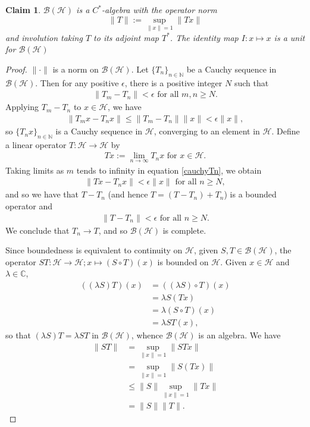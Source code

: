 \documentclass[12pt,a4paper]{amsart}
\theoremstyle{plain}
\newtheorem*{claim}{Claim}
\theoremstyle{definition}
\renewcommand{\H}{\mathcal{H}}
\newcommand{\B}{\mathcal{B}}
\newcommand{\BH}{\mathcal{\B(\H)}}
\newcommand{\1}{\mathbbm{1}}
\newcommand{\C}{\mathbb{C}}
\newcommand{\N}{\mathbb{N}}
\begin{document}
\begin{claim} $\B(\H)$ is a $C^\ast$-algebra with the operator norm 
\[
	\|T\|:= \sup_{\|x\|=1}{\|Tx\|}
\]
and involution taking $T$ to its adjoint map $T^\ast$. 
The identity map $I:x\mapsto x$ is a unit for $\BH$
\end{claim}
\begin{proof}
	$\|\cdot\|$ is a norm on $\BH$. Let $\{T_n\}_{n\in\N}$ be a Cauchy sequence 
	in $\BH$. Then for any positive $\epsilon$, there is a positive integer $N$ such that 
	\begin{align*}
		\|T_m-T_n\| < \epsilon \mbox{ for all } m,n \geq N.
	\end{align*}
	Applying $T_m-T_n$ to $x \in \H$, we have 
	\begin{align}\label{cauchyTn}
		\|T_mx-T_nx\| \leq \|T_m-T_n\| \|x\| < \epsilon \|x\|,
	\end{align}
	so $\{T_nx\}_{n\in\N}$ is a Cauchy sequence in $\H$, converging to an element in $\H$.
	Define a linear operator $T:\H \to \H$ by 
	\begin{align*}
		Tx:= \lim_{n\to\infty}{T_nx} \mbox{ for } x \in \H.
	\end{align*}
	Taking limits as $m$ tends to infinity in equation \eqref{cauchyTn}, we obtain
	\begin{align*}
		\|Tx-T_nx\| < \epsilon \|x\| \mbox{ for all }n \geq N,
	\end{align*}
	and so we have that $T-T_n$ (and hence $T=(T-T_n)+T_n$) is a bounded operator and  
	\begin{align*}
		\|T-T_n\| <\epsilon \mbox{ for all }n \geq N.
	\end{align*}
	We conclude that $T_n \to T$, and so $\BH$ is complete.
	
	Since boundedness is equivalent to continuity on $\H$, given $S,T\in\BH$, the operator 
	$ST:\H \to \H; x \mapsto (S\circ T)(x)$ is bounded on $\H$.
	Given $x\in\H$ and $\lambda\in\C$, 
	\begin{align*}
			((\lambda S)T)(x)
		&=	((\lambda S)\circ T)(x)												\\
		&=	\lambda S(Tx)														\\
		&=	\lambda (S\circ T)(x)												\\
		&=	\lambda ST(x),
	\end{align*} 
	so that $(\lambda S)T = \lambda ST$ in $\BH$, whence $\BH$ is an algebra.
	We have 
	\begin{align*}
				\|ST\|
		&=		\sup_{\|x\|=1}{\|STx\|} 										\\
		&=		\sup_{\|x\|=1}{\|S(Tx)\|} 										\\
		&\leq	\|S\| \sup_{\|x\|=1}{\|Tx\|} 									\\
		&=		\|S\| \|T\|.
	\end{align*}
	

\end{proof}
\end{document}
